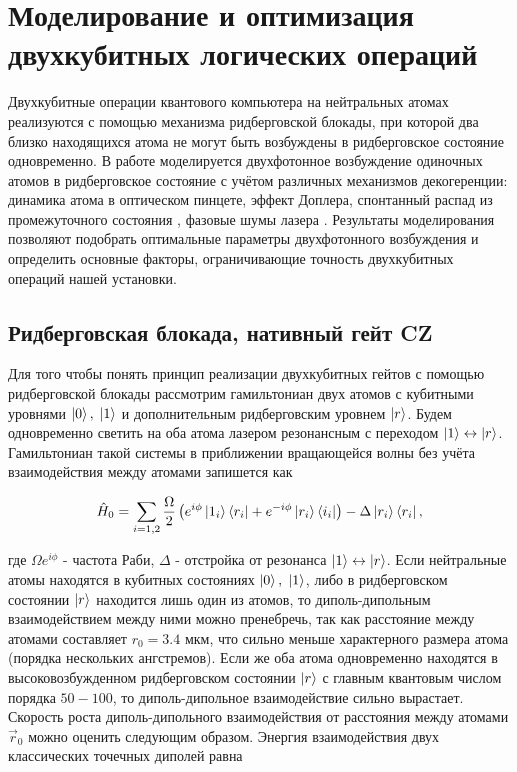 \section{Моделирование и оптимизация двухкубитных логических операций}
\label{sec:chapter_4}

Двухкубитные операции квантового компьютера на нейтральных атомах реализуются с помощью механизма ридберговской блокады, при которой два близко находящихся атома не могут быть возбуждены в ридберговское состояние одновременно. В работе моделируется двухфотонное возбуждение одиночных атомов в ридберговское состояние с учётом различных механизмов декогеренции: динамика атома в оптическом пинцете, эффект Доплера, спонтанный распад из промежуточного состояния \cite{Browayes}, фазовые шумы лазера \cite{Saffman_Noise}. Результаты моделирования позволяют подобрать оптимальные параметры двухфотонного возбуждения и определить основные факторы, ограничивающие точность двухкубитных операций нашей установки.

\subsection{Ридберговская блокада, нативный гейт CZ}

Для того чтобы понять принцип реализации двухкубитных гейтов с помощью ридберговской блокады рассмотрим гамильтониан двух атомов с кубитными уровнями $\left| 0 \right\rangle, \; \left| 1 \right\rangle$ и дополнительным ридберговским уровнем $\left| r \right\rangle$. Будем одновременно светить на оба атома лазером резонансным с переходом $\left| 1 \right\rangle \leftrightarrow \left| r \right\rangle$. Гамильтониан такой системы в приближении вращающейся волны без учёта взаимодействия между атомами запишется как 

\begin{equation}
	\hat{H}_0 = \sum_{i=1,2}\frac{\Omega}{2}\left(e^{i\phi}\left| 1_i \right\rangle\left\langle r_i \right| + e^{-i\phi}\left| r_i \right\rangle\left\langle i_i \right|\right)-\Delta \left| r_i \right\rangle\left\langle r_i \right|,
\end{equation}

где $\Omega e^{i\phi}$ - частота Раби, $\Delta$ - отстройка от резонанса $\left| 1 \right\rangle \leftrightarrow \left| r \right\rangle$. Если нейтральные атомы находятся в кубитных состояниях $\left| 0 \right\rangle,\; \left| 1 \right\rangle$, либо в ридберговском состоянии $\left| r \right\rangle$ находится лишь один из атомов, то диполь-дипольным взаимодействием между ними можно пренебречь, так как расстояние между атомами составляет $r_0 = 3.4 \text{ мкм}$, что сильно меньше характерного размера атома (порядка нескольких ангстремов). Если же оба атома одновременно находятся в высоковозбужденном ридберговском состоянии $\left| r \right\rangle$ с главным квантовым числом порядка $50-100$, то диполь-дипольное взаимодействие сильно вырастает. Скорость роста диполь-дипольного взаимодействия от расстояния между атомами $\vec{r}_0$ можно оценить следующим образом. Энергия взаимодействия двух классических точечных диполей равна

